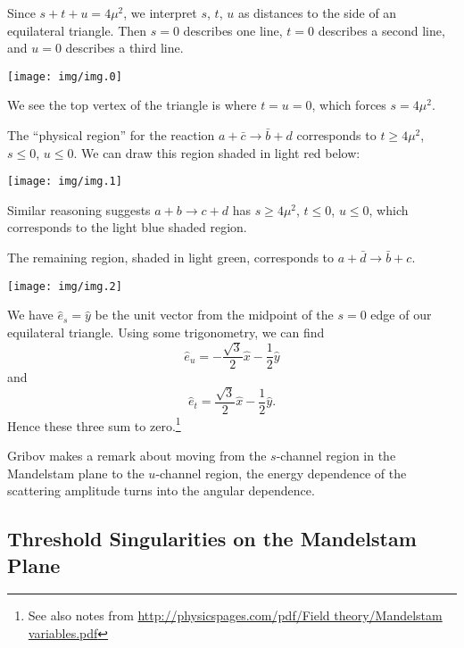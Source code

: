 \M[1]
Since $s+t+u=4\mu^{2}$, we interpret $s$, $t$, $u$ as distances to the
side of an equilateral triangle. Then $s=0$ describes one line, $t=0$
describes a second line, and $u=0$ describes a third line.

\begin{center}
  \texttt{[image: img/img.0]}
\end{center}


We see the top vertex of the triangle is where $t=u=0$, which forces
$s=4\mu^{2}$.

\M
The ``physical region'' for the reaction $a+\bar{c}\to\bar{b}+d$
corresponds to $t\geq4\mu^{2}$, $s\leq0$, $u\leq0$. We can draw this
region shaded in light red below:

\begin{center}
  \texttt{[image: img/img.1]}
\end{center}

Similar reasoning suggests $a+b\to c+d$ has $s\geq4\mu^{2}$, $t\leq0$,
$u\leq0$, which corresponds to the light blue shaded region.

The remaining region, shaded in light green, corresponds to
$a+\bar{d}\to\bar{b}+c$.

\begin{center}
  \texttt{[image: img/img.2]}
\end{center}

\M
We have $\widehat{e}_{s}=\widehat{y}$ be the unit vector from the
midpoint of the $s=0$ edge of our equilateral triangle. Using some
trigonometry, we can find
\begin{equation}
\widehat{e}_{u} = -\frac{\sqrt{3}}{2}\widehat{x} - \frac{1}{2}\widehat{y}
\end{equation}
and
\begin{equation}
\widehat{e}_{t} = \frac{\sqrt{3}}{2}\widehat{x} - \frac{1}{2}\widehat{y}.
\end{equation}
Hence these three sum to zero.\footnote{See also notes from
\url{http://physicspages.com/pdf/Field theory/Mandelstam variables.pdf}}

\M[-1]
Gribov makes a remark about moving from the $s$-channel region in the
Mandelstam plane to the $u$-channel region, the energy dependence of the
scattering amplitude turns into the angular dependence.

\subsection{Threshold Singularities on the Mandelstam Plane}

